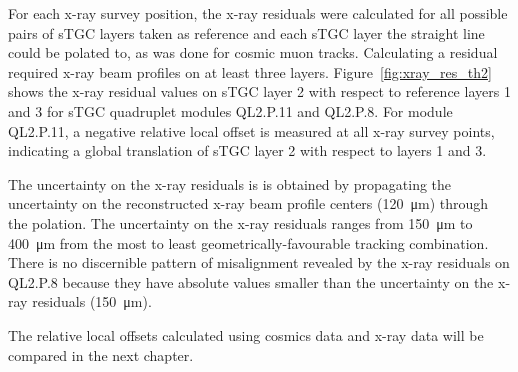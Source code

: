 For each x-ray survey position, the x-ray residuals were calculated for all possible pairs of sTGC layers taken as reference and each sTGC layer the straight line could be polated to, as was done for cosmic muon tracks. Calculating a residual required x-ray beam profiles on at least three layers. Figure~\ref{fig:xray_res_th2} shows the x-ray residual values on sTGC layer 2 with respect to reference layers 1 and 3 for sTGC quadruplet modules QL2.P.11 and QL2.P.8.  For module QL2.P.11, a negative relative local offset is measured at all x-ray survey points, indicating a global translation of sTGC layer 2 with respect to layers 1 and 3.

The uncertainty on the x-ray residuals is is obtained by propagating the uncertainty on the reconstructed x-ray beam profile centers (\SI{120}{\micro\meter}) through the polation. The uncertainty on the x-ray residuals ranges from \SI{150}{\micro\meter} to \SI{400}{\micro\meter} from the most to least geometrically-favourable tracking combination. There is no discernible pattern of misalignment revealed by the x-ray residuals on QL2.P.8 because they have absolute values smaller than the uncertainty on the x-ray residuals (\SI{150}{\micro\meter}). 

The relative local offsets calculated using cosmics data and x-ray data will be compared in the next chapter.
